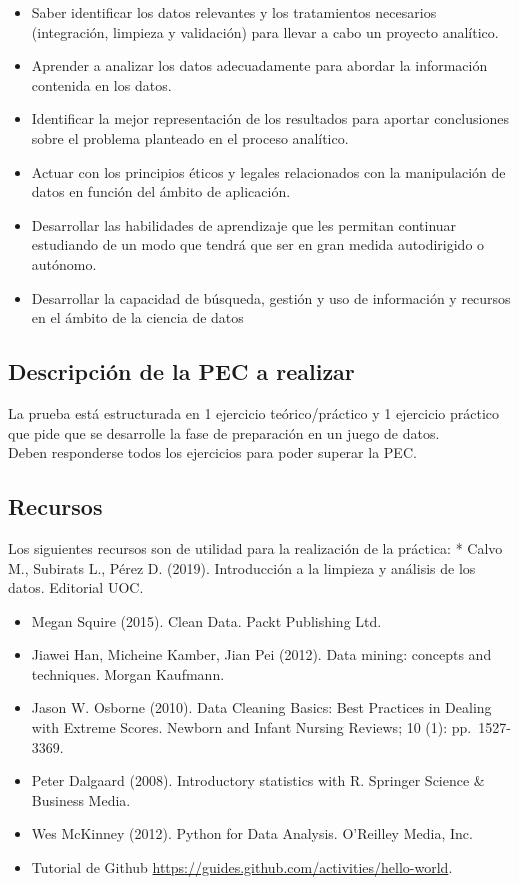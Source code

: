 \documentclass[
]{article}
\begin{document}
\begin{itemize}
\item
  Saber identificar los datos relevantes y los tratamientos necesarios
  (integración, limpieza y validación) para llevar a cabo un proyecto
  analítico.
\item
  Aprender a analizar los datos adecuadamente para abordar la
  información contenida en los datos.
\item
  Identificar la mejor representación de los resultados para aportar
  conclusiones sobre el problema planteado en el proceso analítico.
\item
  Actuar con los principios éticos y legales relacionados con la
  manipulación de datos en función del ámbito de aplicación.
\item
  Desarrollar las habilidades de aprendizaje que les permitan continuar
  estudiando de un modo que tendrá que ser en gran medida autodirigido o
  autónomo.
\item
  Desarrollar la capacidad de búsqueda, gestión y uso de información y
  recursos en el ámbito de la ciencia de datos
\end{itemize}

\hypertarget{descripciuxf3n-de-la-pec-a-realizar}{%
\subsection{Descripción de la PEC a
realizar}\label{descripciuxf3n-de-la-pec-a-realizar}}

La prueba está estructurada en 1 ejercicio teórico/práctico y 1
ejercicio práctico que pide que se desarrolle la fase de preparación en
un juego de datos.\\
Deben responderse todos los ejercicios para poder superar la PEC.

\hypertarget{recursos}{%
\subsection{Recursos}\label{recursos}}

Los siguientes recursos son de utilidad para la realización de la
práctica: * Calvo M., Subirats L., Pérez D. (2019). Introducción a la
limpieza y análisis de los datos. Editorial UOC.

\begin{itemize}
\item
  Megan Squire (2015). Clean Data. Packt Publishing Ltd.
\item
  Jiawei Han, Micheine Kamber, Jian Pei (2012). Data mining: concepts
  and techniques. Morgan Kaufmann.
\item
  Jason W. Osborne (2010). Data Cleaning Basics: Best Practices in
  Dealing with Extreme Scores. Newborn and Infant Nursing Reviews; 10
  (1): pp.~1527-3369.
\item
  Peter Dalgaard (2008). Introductory statistics with R. Springer
  Science \& Business Media.
\item
  Wes McKinney (2012). Python for Data Analysis. O'Reilley Media, Inc.
\item
  Tutorial de Github
  \url{https://guides.github.com/activities/hello-world}.
\end{itemize}
\end{document}
